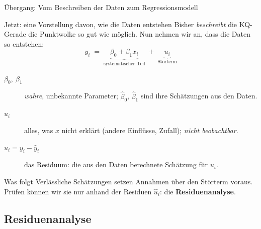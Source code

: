 \documentclass[aspectratio=169,11pt]{beamer}
\begin{document}
\begin{frame}{Übergang: Vom Beschreiben der Daten zum Regressionsmodell}
  \begin{block}{Jetzt: eine Vorstellung davon, wie die Daten entstehen}
    Bisher \emph{beschreibt} die KQ-Gerade die Punktwolke so gut wie möglich. Nun
    nehmen wir an, dass die Daten so entstehen:
    \vspace{-4pt}
    \[
      y_i \;=\; \underbrace{\beta_0 + \beta_1 x_i}_{\text{systematischer Teil}}
             \;+\; \underbrace{u_i}_{\text{Störterm}}
    \]
    \vspace{-8pt}
    \begin{description}
      \item[$\beta_0,\ \beta_1$] \emph{wahre}, unbekannte Parameter;
            $\hat{\beta}_0$, $\hat{\beta}_1$ sind ihre Schätzungen aus den Daten.
      \item[$u_i$] alles, was $x$ nicht erklärt (andere Einflüsse, Zufall);
            \emph{nicht beobachtbar}.
      \item[$\hat{u}_i = y_i - \hat{y}_i$] das Residuum: die aus den Daten
            berechnete Schätzung für $u_i$.
    \end{description}
  \end{block}

  \begin{exampleblock}{Was folgt}
    Verlässliche Schätzungen setzen Annahmen über den Störterm voraus. Prüfen
    können wir sie nur anhand der Residuen $\hat{u}_i$: die \textbf{Residuenanalyse}.
  \end{exampleblock}
\end{frame}

\subsection{Residuenanalyse}
\end{document}
